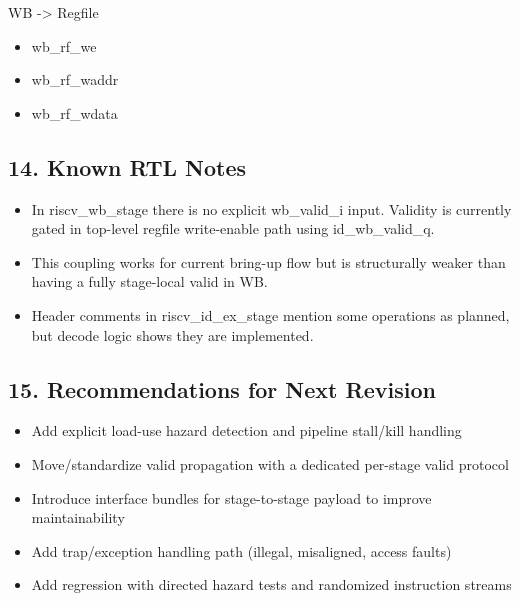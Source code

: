 \documentclass[]{article}
\providecommand{\tightlist}{%
  \setlength{\itemsep}{0pt}\setlength{\parskip}{0pt}}
\begin{document}
WB -\textgreater{} Regfile

\begin{itemize}
\tightlist
\item
  wb\_rf\_we
\item
  wb\_rf\_waddr
\item
  wb\_rf\_wdata
\end{itemize}

\hypertarget{14-known-rtl-notes}{%
\subsection{14. Known RTL Notes}\label{14-known-rtl-notes}}

\begin{itemize}
\tightlist
\item
  In riscv\_wb\_stage there is no explicit wb\_valid\_i input. Validity
  is currently gated in top-level regfile write-enable path using
  id\_wb\_valid\_q.
\item
  This coupling works for current bring-up flow but is structurally
  weaker than having a fully stage-local valid in WB.
\item
  Header comments in riscv\_id\_ex\_stage mention some operations as
  planned, but decode logic shows they are implemented.
\end{itemize}

\hypertarget{15-recommendations-for-next-revision}{%
\subsection{15. Recommendations for Next
Revision}\label{15-recommendations-for-next-revision}}

\begin{itemize}
\tightlist
\item
  Add explicit load-use hazard detection and pipeline stall/kill
  handling
\item
  Move/standardize valid propagation with a dedicated per-stage valid
  protocol
\item
  Introduce interface bundles for stage-to-stage payload to improve
  maintainability
\item
  Add trap/exception handling path (illegal, misaligned, access faults)
\item
  Add regression with directed hazard tests and randomized instruction
  streams
\end{itemize}
\end{document}
